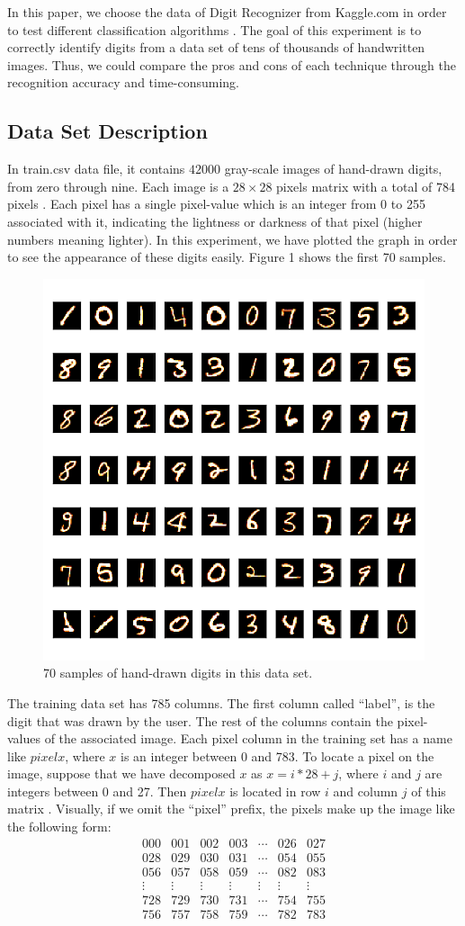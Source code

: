 \documentclass[sigconf]{acmart}
\begin{document}
In this paper, we choose the data of Digit Recognizer from Kaggle.com in order to test different classification algorithms \cite{kaggle}. The goal of this experiment is to correctly identify digits from a data set of tens of thousands of handwritten images. Thus, we could compare the pros and cons of each technique through the recognition accuracy and time-consuming.

\subsection{Data Set Description}

In train.csv data file, it contains $42000$ gray-scale images of hand-drawn digits, from zero through nine. Each image is a $28 \times 28$ pixels matrix with a total of 784 pixels \cite{kaggle}. Each pixel has a single pixel-value which is an integer from 0 to 255 associated with it, indicating the lightness or darkness of that pixel (higher numbers meaning lighter). In this experiment, we have plotted the graph in order to see the appearance of these digits easily. Figure 1 shows the first 70 samples.
\begin{figure}
\includegraphics[width=0.35\columnwidth]{images/data_samples}
\caption{70 samples of hand-drawn digits in this data set.}
\end{figure}

The training data set has 785 columns. The first column called ``label'', is the digit that was drawn by the user. The rest of the columns contain the pixel-values of the associated image. Each pixel column in the training set has a name like $pixelx$, where $x$ is an integer between 0 and 783. To locate a pixel on the image, suppose that we have decomposed $x$ as $x=i*28+j$, where $i$ and $j$ are integers between 0 and 27. Then $pixelx$ is located in row $i$ and column $j$ of this matrix \cite{kaggle}. Visually, if we omit the ``pixel'' prefix, the pixels make up the image like the following form:
$$
  \begin{matrix}
   000 & 001 & 002 & 003 & \cdots & 026 & 027 \\
   028 & 029 & 030 & 031 & \cdots & 054 & 055 \\
   056 & 057 & 058 & 059 & \cdots & 082 & 083 \\
   \vdots & \vdots & \vdots & \vdots & \vdots & \vdots & \vdots \\
   728 & 729 & 730 & 731 & \cdots & 754 & 755 \\
   756 & 757 & 758 & 759 & \cdots & 782 & 783
  \end{matrix}
$$
\end{document}
